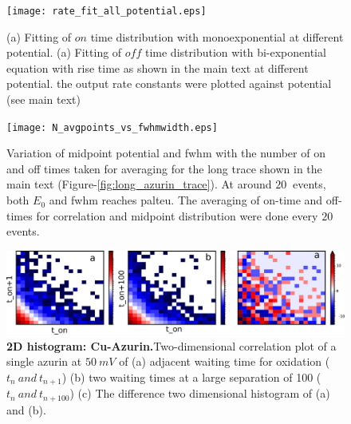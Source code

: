\begin{figure}
  \centering
  \texttt{[image: rate\_fit\_all\_potential.eps]}
  \makeatletter
  \renewcommand{\fnum@figure}{\figurename~S\thefigure}
  \makeatother
  \caption{(a) Fitting of $on$ time distribution with monoexponential at different potential. (a) Fitting of $off$ time distribution with bi-exponential equation with rise time as shown in the main text at different potential. the output rate constants were plotted against potential (see main text)}
  \label{SIfig: rate_fit_all_potential}
\end{figure}
\begin{figure}
  \centering
  \texttt{[image: N\_avgpoints\_vs\_fwhmwidth.eps]}
  \makeatletter
  \renewcommand{\fnum@figure}{\figurename~S\thefigure}
  \makeatother
  \caption{Variation of midpoint potential and fwhm with the number of on and off times taken for averaging for the long trace shown in the main text (Figure-\ref{fig:long_azurin_trace}). At around $20~$ events, both $E_0$ and fwhm reaches palteu. The averaging of on-time and off-times for correlation and midpoint distribution were done every $20$ events.}
  \label{SIfig: N_avgpoints_vs_fwhmwidth}
\end{figure}
\begin{figure}
  \centering
  \includegraphics[width=\textwidth]{Figure_4_on_off_2D_100mV.png}
  \caption{\textbf{2D histogram: Cu-Azurin.}Two-dimensional correlation plot of a single azurin at $50~mV$ of (a) adjacent waiting time for oxidation ($t_{n}~and~t_{n+1}$) (b) two waiting times at a large separation of 100 ($t_{n}~and~t_{n+100}$) (c) The difference two dimensional histogram of (a) and (b).}
  \label{fig:onoff2D}
\end{figure}